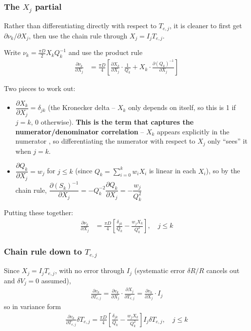 \documentclass[11pt,twoside]{article}
\begin{document}
\subsubsection{The $X_j$ partial}
Rather than differentiating directly with respect to $T_{e,j}$, it is cleaner to first get $\partial \nu_k/\partial X_j$, then use the chain rule through $X_j = I_j T_{e,j}$.

Write $\nu_k = \frac{\pi D}{2} X_k Q_k^{-1}$ and use the product rule
\begin{align*}
    \frac{\partial \nu_k}{\partial X_j} &= \frac{\pi D}{4}\left[ \frac{\partial X_k}{\partial X_j}\cdot \frac{1}{Q_k} + X_k\cdot\frac{\partial \left(Q_k\right)^{-1}}{\partial X_j}\right]
\end{align*}

Two pieces to work out:
\begin{itemize}
    \item $\dfrac{\partial X_k}{\partial X_j} = \delta_{jk}$ (the Kronecker delta -- $X_k$ only depends on itself, so this is 1 if $j=k$, 0 otherwise). \textbf{This is the term that captures the numerator/denominator correlation} -- $X_k$ appears explicitly in the numerator , so differentiating the numerator with respect to $X_j$ only ``sees'' it when $j=k$.
    \item $\dfrac{\partial Q_k}{\partial X_j} = w_j$ for $j\leq k$ (since $Q_k=\sum_{i=0}^k w_i X_i$ is linear in each $X_i$), so by the chain rule, $\dfrac{\partial \left(S_k\right)^{-1}}{\partial X_j} = - Q_k^{-2}\dfrac{\partial Q_k}{\partial X_j} = -\dfrac{w_j}{Q_k^2}$
\end{itemize}

Putting these together:
\begin{align}
    \frac{\partial \nu_k}{\partial X_j} &= \frac{\pi D}{4}\left[ \frac{\delta_{jk}}{Q_k} - \frac{w_j X_k}{Q_k^2} \right], \quad j\leq k
    \label{eq:partial-vk_Xj}
\end{align}

\subsubsection{Chain rule down to $T_{e,j}$}
Since $X_j = I_jT_{e,j}$, with no error through $I_j$ (systematic error $\delta R/R$ cancels out and $\delta V_j = 0$ assumed),
\begin{align*}
    \frac{\partial v_k}{\partial T_{e,j}} = \frac{\partial v_k}{\partial X_j}\cdot \frac{\partial X_j}{\partial T_{e,j}} = \frac{\partial v_k}{\partial X_j} \cdot I_j
\end{align*}
so in variance form
\begin{align*}
    \frac{\partial v_k}{\partial T_{e,j}} \delta T_{e,j} = \frac{\pi D}{4}\left[ \frac{\delta_{jk}}{Q_k} - \frac{w_j X_k}{Q_k^2} \right] I_j \delta T_{e,j}, \quad j\leq k
\end{align*}
\end{document}
